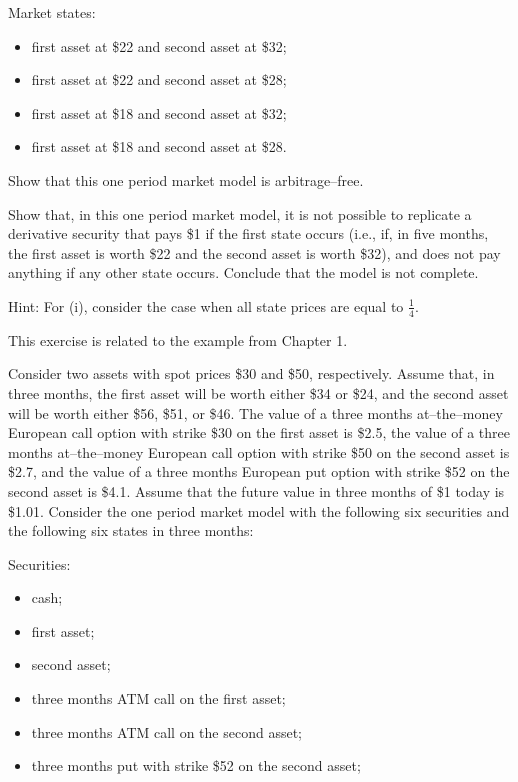 \begin{exercises}
\noindent Market states:
\begin{itemize}
\item first asset at \$22 and second asset at \$32;
\item first asset at \$22 and second asset at \$28;
\item first asset at \$18 and second asset at \$32;
\item first asset at \$18 and second asset at \$28.
\end{itemize}
\begin{subparts}
\item Show that this one period market model is arbitrage--free.
\item Show that, in this one period market model, it is not possible to
replicate a derivative security that pays \$1 if the first state occurs
(i.e., if, in five months, the first asset is worth \$22 and the second
asset is worth \$32), and does not pay anything if any other state occurs.
Conclude that the model is not complete.
\end{subparts}
\noindent Hint: For (i), consider the case when all state prices are equal
to $\frac{1}{4}$.

\item This exercise is related to the example from Chapter 1.

Consider two assets with spot prices \$30 and \$50, respectively. Assume
that, in three months, the first asset will be worth either \$34 or \$24,
and the second asset will be worth either \$56, \$51, or \$46. The value
of a three months at--the--money European call option with strike \$30 on
the first asset is \$2.5, the value of a three months at--the--money
European call option with strike \$50 on the second asset is \$2.7, and
the value of a three months European put option with strike \$52 on the
second asset is \$4.1. Assume that the future value in three months of \$1
today is \$1.01. Consider the one period market model with the following
six securities and the following six states in three months:

\noindent Securities:
\begin{itemize}
\item cash;
\item first asset;
\item second asset;
\item three months ATM call on the first asset;
\item three months ATM call on the second asset;
\item three months put with strike \$52 on the second asset;
\end{itemize}


\end{exercises}
